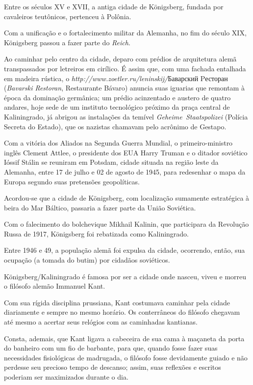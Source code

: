 Entre os séculos XV e XVII, a antiga cidade de Königsberg, fundada por
cavaleiros teutônicos, pertenceu à Polônia.

Com a unificação e o fortalecimento militar da Alemanha, no fim do
século XIX, Königsberg passou a fazer parte do \emph{Reich}.

Ao caminhar pelo centro da cidade, deparo com prédios de arquitetura
alemã transpassados por letreiros em cirílico. É assim que, com uma
fachada entalhada em madeira rústica, o
\emph{http://www.zoetler.ru/leninskij/}{Баварский Pесторан}
(\emph{Bavarski Restoran}, Restaurante Bávaro) anuncia suas iguarias que
remontam à época da dominação germânica; um prédio acinzentado e austero
de quatro andares, hoje sede de um instituto tecnológico próximo da
praça central de Kaliningrado, já abrigou as instalações da temível
\emph{Geheime~Staatspolizei} (Polícia Secreta do Estado), que os
nazistas chamavam pelo acrônimo de Gestapo.

Com a vitória dos Aliados na Segunda Guerra Mundial, o primeiro-ministro
inglês Clement Attlee, o presidente dos EUA Harry Truman e o ditador
soviético Ióssif Stálin se reuniram em Potsdam, cidade situada na região
leste da Alemanha, entre 17 de julho e 02 de agosto de 1945, para
redesenhar o mapa da Europa segundo suas pretensões geopolíticas.

Acordou-se que a cidade de Königsberg, com localização sumamente
estratégica à beira do Mar Báltico, passaria a fazer parte da União
Soviética.

Com o falecimento do bolchevique Mikhail Kalinin, que participara da
Revolução Russa de 1917, Königsberg foi rebatizada como Kaliningrado.

Entre 1946 e 49, a população alemã foi expulsa da cidade, ocorrendo,
então, sua ocupação (a tomada do butim) por cidadãos soviéticos.

Königsberg/Kaliningrado é famosa por ser a cidade onde nasceu, viveu e
morreu o filósofo alemão Immanuel Kant.

Com sua rígida disciplina prussiana, Kant costumava caminhar pela cidade
diariamente e sempre no mesmo horário. Os conterrâneos do filósofo
chegavam até mesmo a acertar seus relógios com as caminhadas kantianas.

Consta, ademais, que Kant ligava a cabeceira de sua cama à maçaneta da
porta do banheiro com um fio de barbante, para que, quando fosse fazer
suas necessidades fisiológicas de madrugada, o filósofo fosse
devidamente guiado e não perdesse seu precioso tempo de descanso; assim,
suas reflexões e escritos poderiam ser maximizados durante o dia.

